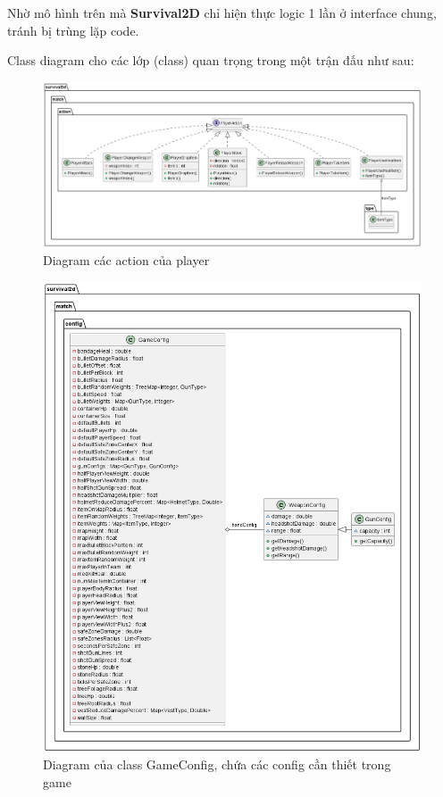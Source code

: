 \documentclass[12pt,a4paper]{article}
\begin{document}
  Nhờ mô hình trên mà \textbf{Survival2D} chỉ hiện thực logic 1 lần ở interface chung, tránh bị trùng lặp code.
  
  Class diagram cho các lớp (class) quan trọng trong một trận đấu như sau:

  \begin{figure}
    \centering
    \includegraphics[width=\textwidth]{Img/uml/action.png}
    \caption{Diagram các action của player}
  \end{figure}

  \begin{figure}[H]
    \centering
    \includegraphics[width=\textwidth,height=0.95\textheight,keepaspectratio]{Img/uml/config.png}
    \caption{Diagram của class GameConfig, chứa các config cần thiết trong game}
  \end{figure}
  
\end{document}
